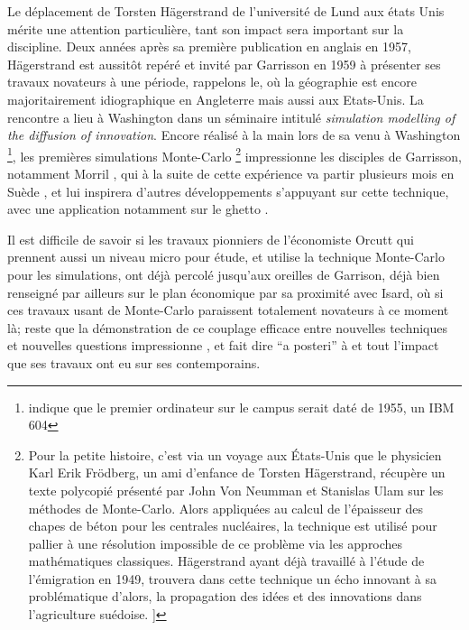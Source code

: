 Le déplacement de Torsten Hägerstrand de l'université de Lund aux états Unis mérite une attention particulière, tant son impact sera important sur la discipline. Deux années après sa première publication en anglais en 1957, Hägerstrand est aussitôt repéré et invité par Garrisson en 1959 à présenter ses travaux novateurs à une période, rappelons le, où la géographie est encore majoritairement idiographique en Angleterre mais aussi aux Etats-Unis. La rencontre a lieu à Washington dans un séminaire intitulé \textit{simulation modelling of the diffusion of innovation}. Encore réalisé à la main lors de sa venu à Washington \footnote{ \textcite{Barnes2006} indique que le premier ordinateur sur le campus serait daté de 1955, un IBM 604}, les premières simulations Monte-Carlo \footnote{Pour la petite histoire, c'est via un voyage aux États-Unis que le physicien Karl Erik Frödberg, un ami d'enfance de Torsten Hägerstrand, récupère un texte polycopié présenté par John Von Neumman et Stanislas Ulam sur les méthodes de Monte-Carlo. Alors appliquées au calcul de l'épaisseur des chapes de béton pour les centrales nucléaires, la technique est utilisé pour pallier à une résolution impossible de ce problème via les approches mathématiques classiques.  Hägerstrand ayant déjà travaillé à l'étude de l'émigration en 1949, trouvera dans cette technique un écho innovant à sa problématique d'alors, la propagation des idées et des innovations dans l'agriculture suédoise. \autocite[26-28]{Gould2004}]} impressionne les disciples de Garrisson, notamment Morril \autocite[120]{Unwin1992}, qui à la suite de cette expérience va partir plusieurs mois en Suède \autocite{Morril2005}, et lui inspirera d'autres développements s'appuyant sur cette technique, avec une application notamment sur le ghetto \textcite{Marble1972}.

Il est difficile de savoir si les travaux pionniers de l'économiste Orcutt \autocite{Orcutt1957, Orcutt1960} qui prennent aussi un niveau micro pour étude, et utilise la technique Monte-Carlo pour les simulations, ont déjà percolé jusqu'aux oreilles de Garrison, déjà bien renseigné par ailleurs sur le plan économique par sa proximité avec Isard, où si ces travaux usant de Monte-Carlo paraissent totalement novateurs à ce moment là; reste que la démonstration de ce couplage efficace entre nouvelles techniques et nouvelles questions impressionne \autocite[120]{Unwin1992}, et fait dire \foreignquote{latin}{a posteri} à \textcite{Morril2005} et \textcite{Gould1970} tout l'impact que ses travaux ont eu sur ses contemporains.

